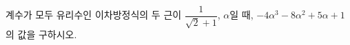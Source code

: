 계수가 모두 유리수인 이차방정식의 두 근이 $\dfrac{1}{\sqrt{2}+1}$, $\alpha$일 때, $-4\alpha^3-8\alpha^2+5\alpha+1$의 값을 구하시오.
